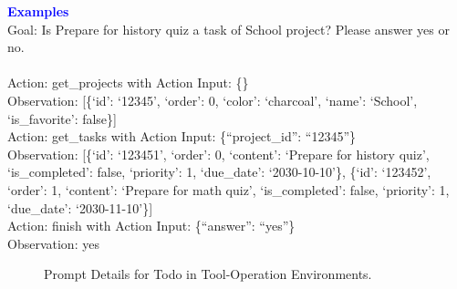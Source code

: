 \begin{tcolorbox}[breakable,title=Prompt Details for Todo]
\textbf{\textcolor{blue}{Examples}}\\
Goal: Is Prepare for history quiz a task of School project? Please answer yes or no.\\
\\
Action: get\_projects with Action Input: \{\}\\
Observation: [\{`id': `12345', `order': 0, `color': `charcoal', `name': `School', `is\_favorite': false\}]\\
Action: get\_tasks with Action Input: \{``project\_id'': ``12345''\}\\
Observation: [\{`id': `123451', `order': 0, `content': `Prepare for history quiz', `is\_completed': false, `priority': 1, `due\_date': `2030-10-10'\}, \{`id': `123452', `order': 1, `content': `Prepare for math quiz', `is\_completed': false, `priority': 1, `due\_date': `2030-11-10'\}]\\
Action: finish with Action Input: \{``answer'': ``yes''\}\\
Observation: yes\\
\end{tcolorbox}
\begin{figure}[!h]
    \vspace{-0.08cm}
    \caption{Prompt Details for Todo in Tool-Operation Environments.}
    \label{fig:todo_prompt}
\end{figure}